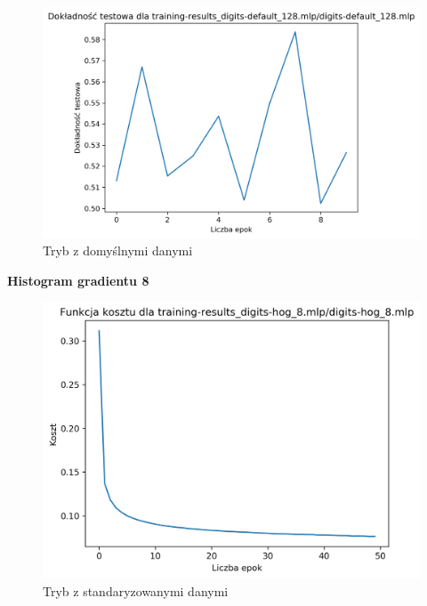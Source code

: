 \documentclass{classrep}
\begin{document}
{{{\begin{figure}[!htbp]
                    \includegraphics[width=155mm]{wykresy/digits-default_128_mlp_testing-accuracy.png}
                    \caption{Tryb z domyślnymi danymi}
                \end{figure}
                \FloatBarrier
                \textbf{Histogram gradientu 8}
                \begin{figure}[!htbp]
                    \centering
                    \includegraphics[width=135mm]{wykresy/digits-hog_8_mlp_cost.png}
                    \caption{Tryb z standaryzowanymi danymi}
                \end{figure}
                \begin{figure}[!htbp]
                    \centering

\end{figure}}}}
\end{document}
